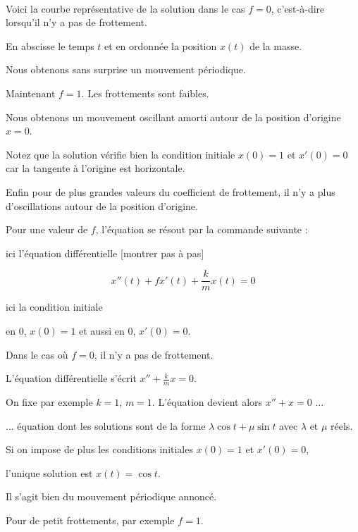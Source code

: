 ~

Voici la courbe représentative de la solution dans le cas $f=0$, c'est-à-dire lorsqu'il n'y a pas de frottement.

En abscisse le temps $t$ et en ordonnée la position $x(t)$ de la masse.

Nous obtenons sans surprise un mouvement périodique.

\change

Maintenant $f=1$. Les frottements sont faibles.

Nous obtenons un mouvement oscillant amorti autour de la position d'origine $x=0$.
 
Notez que la solution vérifie bien la condition initiale $x(0)=1$ et $x'(0)=0$ car la tangente à l'origine est horizontale. 
 
\change

Enfin pour de plus grandes valeurs du coefficient de frottement,
il n'y a plus d'oscillations autour de la position d'origine.



\diapo


Pour une valeur de $f$, l'équation se résout par la commande suivante :

ici l'équation différentielle [montrer pas à pas] 

$$x''(t) +f x'(t)+ \frac{k}{m} x(t) = 0$$

ici la condition initiale 

en $0$, $x(0) = 1$ et aussi en $0$, $x'(0)=0$.


\change
 Dans le cas où $f=0$, il n'y a pas de frottement. 

\change 
 L'équation différentielle s'écrit
  $x''+ \frac{k}{m} x = 0$. 
  
\change
On fixe par exemple  $k=1$, $m=1$. L'équation devient alors
  $x''+ x = 0$ ...
  
\change  
 ...  équation dont les solutions sont de la forme $\lambda \cos t + \mu \sin t$ avec $\lambda$ et $\mu$ réels.
  
\change
Si on impose de plus les conditions initiales $x(0)=1$ et $x'(0)=0$, 

\change 
l'unique solution est $x(t) = \cos t$.
 
\change 
Il s'agit bien du mouvement périodique annoncé.


\change
Pour de petit frottements, par exemple $f=1$.


